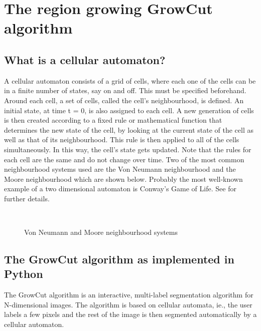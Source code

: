 \documentclass[a4paper,10pt]{article}
\begin{document}
\section{The region growing GrowCut algorithm}
\subsection{What is a cellular automaton?}
A cellular automaton consists of a grid of cells, where each one of the cells can be in a finite number of states, say on and off.  This must be specified beforehand.  Around each cell, a set of cells, called the cell's neighbourhood, is defined.  An initial state, at time t = 0, is also assigned to each cell.  A new generation of cells is then created according to a fixed rule or mathematical function that determines the new state of the cell, by looking at the current state of the cell as well as that of its neighbourhood.  This rule is then applied to all of the cells simultaneously.  In this way, the cell's state gets updated.  Note that the rules for each cell are the same and do not change over time.  Two of the most common neighbourhood systems used are the Von Neumann neighbourhood and the Moore neighbourhood which are shown below.  Probably the most well-known example of a two dimensional automaton is Conway's Game of Life.  See \cite{gol} for further details.

\begin{figure}[H]
\centering
\mbox{ \quad
{}} \caption{Von Neumann and Moore neighbourhood systems \cite{n}}
\end{figure}

\subsection{The GrowCut algorithm as implemented in Python}
The GrowCut algorithm \cite{alg} is an interactive, multi-label segmentation algorithm for N-dimensional images.  The algorithm is based on cellular automata, ie.,  the user labels a few pixels and the rest of the image is then segmented automatically by a cellular automaton. \\
\end{document}
